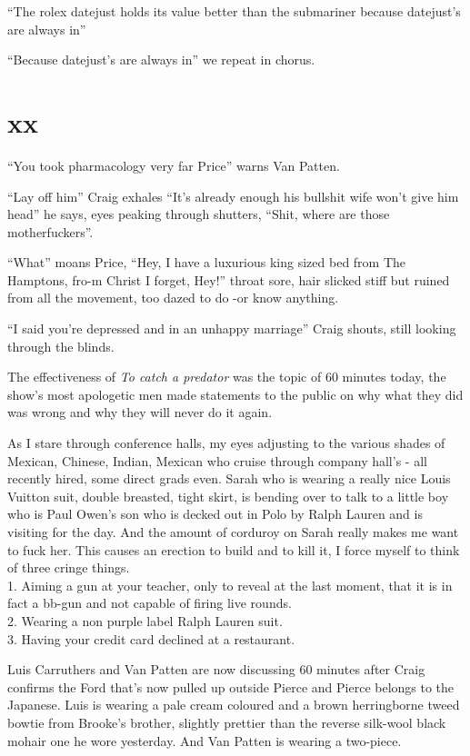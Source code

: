 \documentclass[19pt,openany]{book}
\begin{document}
``The rolex datejust holds its value
better than the submariner because datejust's are always in''

``Because datejust's are always in'' we repeat in chorus.
\chapter{xx}

``You took pharmacology very far Price'' warns Van Patten.

``Lay off him'' Craig exhales ``It's already
enough his bullshit wife won't give
him head'' he says, eyes peaking through shutters, ``Shit,
where are those motherfuckers''.

``What'' moans Price, ``Hey, I
have a luxurious king sized bed from
The Hamptons, fro-m
Christ I forget, Hey!'' throat sore,
hair slicked stiff but ruined from all the
movement, too dazed to do -or know anything.

``I said you're depressed and in an unhappy marriage'' Craig
shouts, still looking through the blinds.

The effectiveness
of \textit{To catch a predator} was the
topic of 60 minutes today, the show's most apologetic
men made statements to the public on why what they did
was wrong and why they will never do it again.

As I stare through conference halls, my eyes
adjusting to the various shades of Mexican,
Chinese, Indian, Mexican who cruise through company
hall's - all recently hired, some direct grads even.
Sarah who
is wearing a really nice Louis Vuitton suit,
double breasted, tight skirt, is bending
over to talk to a little boy who is Paul Owen's son
who is decked out in Polo by Ralph Lauren and is
visiting for the day. And the
amount of corduroy on Sarah really makes me
want to fuck her. This causes an erection to build and to kill it, I force myself to think of three cringe things.\\
1. Aiming a gun at your teacher, only to reveal at the last moment, that it is in fact a bb-gun and not capable of firing live rounds.\\
2. Wearing a non purple label Ralph Lauren suit.\\
3. Having your credit card declined at a restaurant.

Luis Carruthers and Van Patten are now discussing
60 minutes after Craig confirms the Ford
that's now pulled up outside Pierce and Pierce belongs to the Japanese.
Luis is wearing a pale cream coloured and a brown herringborne
tweed bowtie from Brooke's brother, slightly prettier than the
reverse silk-wool black mohair one he wore yesterday. And Van
Patten is wearing a two-piece.
\end{document}
